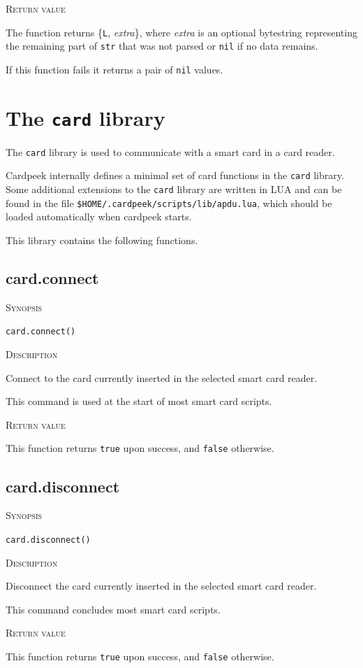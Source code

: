 \documentclass[11pt]{report}
\newcommand{\mansection}[1]{\vspace{0.5em}\par\noindent\textsc{#1}\vspace{0.5em}\par}
\newcommand{\syn}[1]{\texttt{#1}}
\begin{document}
\mansection{Return value}
  The function returns  \{\syn{L}, \textit{extra}\}, where \textit{extra} is an optional bytestring 
  representing the remaining part of \syn{str} that was not parsed or 
  \syn{nil} if no data remains.

  If this function fails it returns a pair of \syn{nil} values.


\section{The \syn{card} library}

The \syn{card} library is used to communicate with a smart card in a card reader.

Cardpeek internally defines a minimal set of card functions in the \syn{card} 
library.
Some additional extensions to the \syn{card} library are written in LUA and can
be found in the file \syn{\$HOME/.cardpeek/scripts/lib/apdu.lua}, which should 
be loaded automatically when cardpeek starts.

This library contains the following functions.


\subsection{card.connect}

\mansection{Synopsis}
\syn{card.connect()}

\mansection{Description}
  Connect to the card currently inserted in the selected smart card reader. 

  This command is used at the start of most smart card scripts.

\mansection{Return value}
   This function returns \syn{true} upon success, and \syn{false} otherwise.


\subsection{card.disconnect}

\mansection{Synopsis}
\syn{card.disconnect()}

\mansection{Description}
  Disconnect the card currently inserted in the selected smart card reader.
	  
  This command concludes most smart card scripts.

\mansection{Return value}
  This function returns \syn{true} upon success, and \syn{false} otherwise.
\end{document}
